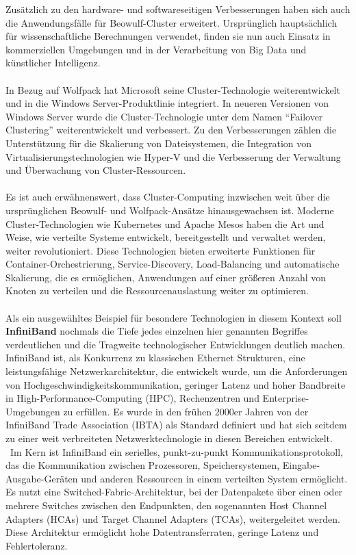 \documentclass[../vs-script-first-v01.tex]{subfiles}
\begin{document}
Zusätzlich zu den hardware- und softwareseitigen Verbesserungen haben sich auch die Anwendungsfälle für Beowulf-Cluster erweitert. Ursprünglich hauptsächlich für wissenschaftliche Berechnungen verwendet, finden sie nun auch Einsatz in kommerziellen Umgebungen und in der Verarbeitung von Big Data und künstlicher Intelligenz.
\\\\
In Bezug auf Wolfpack hat Microsoft seine Cluster-Technologie weiterentwickelt und in die Windows Server-Produktlinie integriert. In neueren Versionen von Windows Server wurde die Cluster-Technologie unter dem Namen \enquote{Failover Clustering} weiterentwickelt und verbessert. Zu den Verbesserungen zählen die Unterstützung für die Skalierung von Dateisystemen, die Integration von Virtualisierungstechnologien wie Hyper-V und die Verbesserung der Verwaltung und Überwachung von Cluster-Ressourcen.
\\\\
Es ist auch erwähnenswert, dass Cluster-Computing inzwischen weit über die ursprünglichen Beowulf- und Wolfpack-Ansätze hinausgewachsen ist. Moderne Cluster-Technologien wie Kubernetes und Apache Mesos haben die Art und Weise, wie verteilte Systeme entwickelt, bereitgestellt und verwaltet werden, weiter revolutioniert. Diese Technologien bieten erweiterte Funktionen für Container-Orchestrierung, Service-Discovery, Load-Balancing und automatische Skalierung, die es ermöglichen, Anwendungen auf einer größeren Anzahl von Knoten zu verteilen und die Ressourcenauslastung weiter zu optimieren.
\\\\
Als ein ausgewähltes Beispiel für besondere Technologien in diesem Kontext soll \textbf{InfiniBand} nochmals die Tiefe jedes einzelnen hier genannten Begriffes verdeutlichen und die Tragweite technologischer Entwicklungen deutlich machen. InfiniBand ist, als Konkurrenz zu klassischen Ethernet Strukturen, eine leistungsfähige Netzwerkarchitektur, die entwickelt wurde, um die Anforderungen von Hochgeschwindigkeitskommunikation, geringer Latenz und hoher Bandbreite in High-Performance-Computing (HPC), Rechenzentren und Enterprise-Umgebungen zu erfüllen. Es wurde in den frühen 2000er Jahren von der InfiniBand Trade Association (IBTA) als Standard definiert und hat sich seitdem zu einer weit verbreiteten Netzwerktechnologie in diesen Bereichen entwickelt.
\\\
Im Kern ist InfiniBand ein serielles, punkt-zu-punkt Kommunikationsprotokoll, das die Kommunikation zwischen Prozessoren, Speichersystemen, Eingabe-Ausgabe-Geräten und anderen Ressourcen in einem verteilten System ermöglicht. Es nutzt eine Switched-Fabric-Architektur, bei der Datenpakete über einen oder mehrere Switches zwischen den Endpunkten, den sogenannten Host Channel Adapters (HCAs) und Target Channel Adapters (TCAs), weitergeleitet werden. Diese Architektur ermöglicht hohe Datentransferraten, geringe Latenz und Fehlertoleranz.
\end{document}
